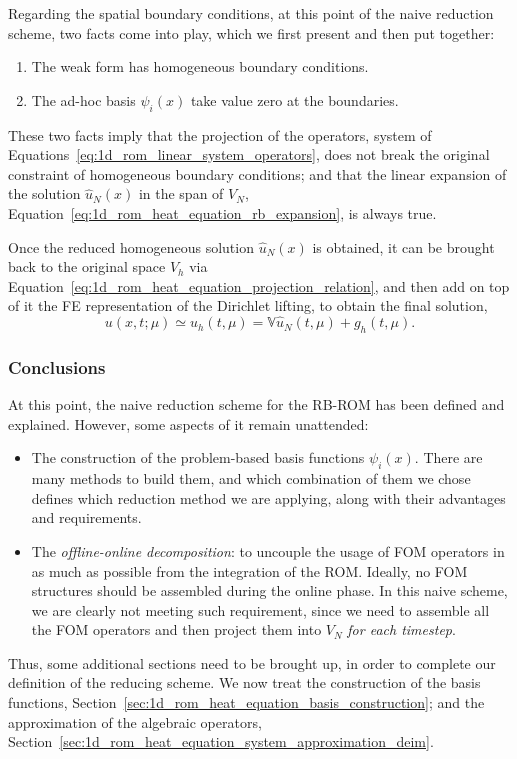 \documentclass[../1_heat_equation.tex]{subfiles}
\newcommand{\rbV}{\ensuremath{\mathbb{V}}}
\begin{document}
Regarding the spatial boundary conditions, at this point of the naive reduction scheme, two facts come into play, which we first present and then put together:
\begin{enumerate}
    \item The weak form has homogeneous boundary conditions.
    \item The ad-hoc basis $\psi_i(x)$ take value zero at the boundaries.
\end{enumerate}
These two facts imply that the projection of the operators, system of Equations~\eqref{eq:1d_rom_linear_system_operators}, does not break the original constraint of homogeneous boundary conditions;
and that the linear expansion of the solution $\hat{u}_N(x)$ in the span of $V_N$, Equation~\eqref{eq:1d_rom_heat_equation_rb_expansion}, is always true.

Once the reduced homogeneous solution $\hat{u}_N(x)$ is obtained, it can be brought back to the original space $V_h$ via Equation~\eqref{eq:1d_rom_heat_equation_projection_relation}, and then add on top of it the FE representation of the Dirichlet lifting, to obtain the final solution,
\begin{equation}
    u(x, t; \mu) \simeq u_h(t, \mu) = \rbV \hat{u}_N(t, \mu) + g_h(t,\mu).
\end{equation}

\subsubsection{Conclusions}
At this point, the naive reduction scheme for the RB-ROM has been defined and explained.
However, some aspects of it remain unattended:
\begin{itemize}
    \item The construction of the problem-based basis functions $\psi_i(x)$.
    There are many methods to build them, and which combination of them we chose defines which reduction method we are applying, along with their advantages and requirements.
    \item The \emph{offline-online decomposition}: to uncouple the usage of FOM operators in as much as possible from the integration of the ROM. 
    Ideally, no FOM structures should be assembled during the online phase.
    In this naive scheme, we are clearly not meeting such requirement, since we need to assemble all the FOM operators and then project them into $V_N$ \emph{for each timestep}.
\end{itemize}
Thus, some additional sections need to be brought up, in order to complete our definition of the reducing scheme.
We now treat the construction of the basis functions, Section~\ref{sec:1d_rom_heat_equation_basis_construction}; and the approximation of the algebraic operators, Section~\ref{sec:1d_rom_heat_equation_system_approximation_deim}.
\end{document}

